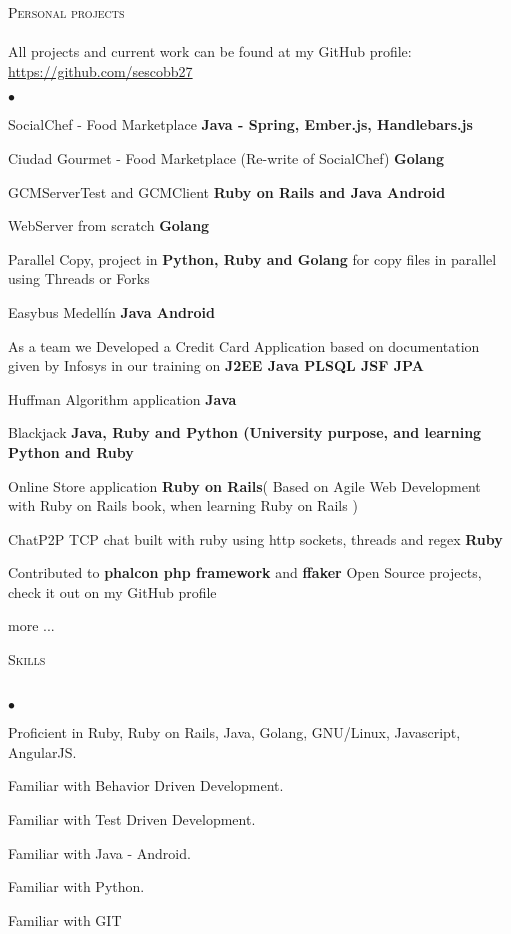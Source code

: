 \documentclass[a4paper]{article}
\newcommand{\lineunder}{\vspace*{-8pt} \\ \hspace*{-18pt} \hrulefill \\}
\newcommand{\header}[1]{{\hspace*{-15pt}\vspace*{6pt}
\textsc{#1}} \vspace*{-6pt} \lineunder}
\newenvironment{achievements}{\begin{list}{$\bullet$}{\topsep 0pt \itemsep
-2pt}}{\vspace*{4pt}\end{list}}
\newcommand{\programming}[1]{{\textbf{#1}}}
\begin{document}
\newpage
\header{Personal projects}
All projects and current work can be found at my GitHub profile: \url{https://github.com/sescobb27}
\begin{achievements}
\item{SocialChef - Food Marketplace} \programming{Java - Spring, Ember.js, Handlebars.js}
\item{Ciudad Gourmet - Food Marketplace (Re-write of SocialChef)} \programming{Golang}
\item{GCMServerTest and GCMClient} \programming{Ruby on Rails and Java Android}
\item{WebServer from scratch} \programming{Golang}
\item{Parallel Copy, project in \programming{Python, Ruby and Golang} for copy files in parallel using Threads or Forks}
\item{Easybus Medell\'in }\programming{Java Android}
\item{As a team we Developed a Credit Card Application based on documentation given by Infosys in our training on \programming{J2EE Java PLSQL JSF JPA}}
\item{Huffman Algorithm application \programming{Java}}
\item{Blackjack \programming{Java, Ruby and Python (University purpose, and learning Python and Ruby}}
\item{Online Store application \programming{Ruby on Rails}( Based on Agile Web Development with Ruby on Rails book, when learning Ruby on Rails )}
\item{ChatP2P TCP chat built with ruby using http sockets, threads and regex \programming{Ruby}}
\item{Contributed to \programming{phalcon php framework} and \programming{ffaker} Open Source projects, check it out on my GitHub profile}
\item{more ...}
\end{achievements}
\header{Skills}
\begin{achievements}
\item {Proficient in Ruby, Ruby on Rails, Java, Golang, GNU/Linux, Javascript, AngularJS.}
\item {Familiar with Behavior Driven Development.}
\item {Familiar with Test Driven Development.}
\item {Familiar with Java - Android.}
\item {Familiar with Python.}
\item {Familiar with GIT}
\end{achievements}
\end{document}
